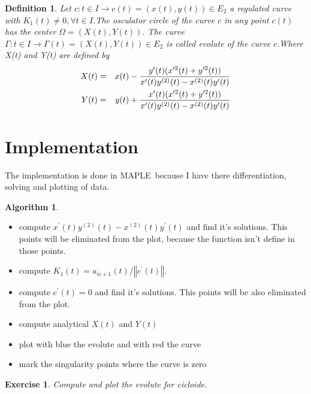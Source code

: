 \documentclass[a4paper]{article}
\newtheorem{algorithm}[theorem]{Algorithm}
\newtheorem{definition}[theorem]{Definition}
\newtheorem{exercise}[theorem]{Exercise}
\begin{document}
\begin{definition}
Let $c:t\in I\rightarrow c(t)=(x(t),y(t))\in E_{2}$ a regulated curve with $%
K_{1}(t)\neq 0,\forall t\in I$.The osculator circle of the curve $c$ in any
point $c(t)$ has the center $\Omega =(X(t),Y(t))$. The curve $\Gamma :t\in
I\rightarrow \Gamma (t)=(X(t),Y(t))\in E_{2}$ is called evolute of the curve 
$c$.Where X(t) and Y(t) are defined by%
\begin{eqnarray*}
X(t) &=&x(t)-\frac{y^{\prime }(t)(x^{\prime 2}(t)+y^{\prime 2}(t))}{%
x^{\prime }(t)y^{(2)}(t)-x^{(2)}(t)y^{\prime }(t)} \\
Y(t) &=&y(t)+\frac{x^{\prime }(t)(x^{\prime 2}(t)+y^{\prime 2}(t))}{%
x^{\prime }(t)y^{(2)}(t)-x^{(2)}(t)y^{\prime }(t)}
\end{eqnarray*}
\end{definition}

\section{Implementation}

The implementation is done in MAPLE\ because I have there differentiation,
solving and plotting of data.

\begin{algorithm}
\end{algorithm}

\begin{itemize}
\item compute $x^{\prime }(t)y^{(2)}(t)-x^{(2)}(t)y^{\prime }(t)$ and find
it's solutions. This points will be eliminated from the plot, because the
function isn't define in those points.

\item compute $K_{1}(t)=a_{ii+1}(t)/\left\Vert c^{\prime }(t)\right\Vert $.

\item compute $c^{\prime }(t)=0$ and find it's solutions. This points will
be also eliminated from the plot. 

\item compute analytical $X(t)$ and $Y(t)$

\item plot with blue the evolute and with red the curve

\item mark the singularity points where the curve is zero
\end{itemize}

\begin{exercise}
Compute and plot the evolute for cicloide.
\end{exercise}
\end{document}
